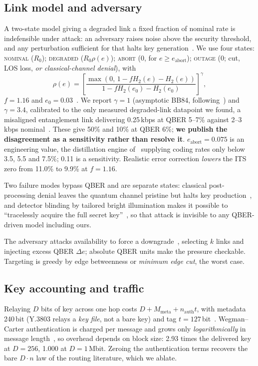 \documentclass[conference]{IEEEtran}
\begin{document}
\subsection{Link model and adversary}\label{sec:link}
A two-state model giving a degraded link a fixed fraction of nominal rate is
indefensible under attack: an adversary raises noise above the security threshold,
and any perturbation sufficient for that halts key generation~\cite{alleaume}. We
use four states: \textsc{nominal} ($R_0$);
\textsc{degraded} ($R_0\rho(e)$); \textsc{abort} ($0$, for
$e\ge e_{\mathrm{abort}}$); \textsc{outage} ($0$; cut, LOS loss, \emph{or
classical-channel denial}), with
\begin{equation}
\rho(e)=\left[\frac{\max\!\left(0,\,1-fH_2(e)-H_2(e)\right)}
{1-fH_2(e_0)-H_2(e_0)}\right]^{\gamma},
\end{equation}
$f=1.16$ and $e_0=0.03$~\cite{sasaki}. We report $\gamma=1$ (asymptotic BB84,
following~\cite{ma}) and $\gamma=3.4$, calibrated to the only measured
degraded-link datapoint we found, a misaligned entanglement link delivering
0.25\,kbps at QBER 5--7\% against 2--3\,kbps nominal~\cite{sasaki}. These give 50\%
and 10\% at QBER 6\%; \textbf{we publish the disagreement as a sensitivity rather
than resolve it}. $e_{\mathrm{abort}}=0.075$ is an engineering value, the
distillation engine of~\cite{sasaki} supplying coding rates only below 3.5, 5.5 and
7.5\%; 0.11 is a sensitivity. Realistic error correction \emph{lowers} the ITS zero
from 11.0\% to 9.9\% at $f=1.16$.

Two failure modes bypass QBER and are separate states: classical post-processing
denial leaves the quantum channel pristine but halts key production~\cite{mehic},
and detector blinding by tailored bright illumination makes it possible to
``tracelessly acquire the full secret key''~\cite{lydersen}, so that attack is
invisible to any QBER-driven model including ours.

The adversary attacks availability to force a downgrade~\cite{schartner}, selecting
$k$ links and injecting excess QBER $\Delta e$; absolute QBER units make the
pressure checkable. Targeting is greedy by edge betweenness or \emph{minimum edge
cut}, the worst case.

\subsection{Key accounting and traffic}\label{sec:acct}
Relaying $D$ bits of key across one hop costs
$D+M_{\mathrm{meta}}+n_{\mathrm{auth}}t$, with metadata 240\,bit (Y.3803 relays a
\emph{key file}, not a bare key) and tag $t=127$\,bit~\cite{walenta}.
Wegman--Carter authentication is charged per message and grows only
\emph{logarithmically} in message length~\cite{fung}, so overhead depends on block
size: 2.93 times the delivered key at $D=256$, 1.000 at $D=1$\,Mbit. Zeroing the
authentication terms recovers the bare $D{\cdot}n$ law of the routing literature,
which we ablate.
\end{document}
